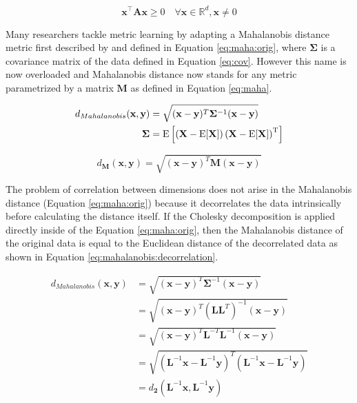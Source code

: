 \documentclass[12pt,a4paper]{report}
\begin{document}
\begin{equation}
\bm{x}^\top \bm{A}\bm{x} \geq 0 \quad \forall \bm{x} \in \mathbb{R}^d, \bm{x} \neq 0 \label{eq:psd:def}
\end{equation}


Many researchers tackle metric learning by adapting a Mahalanobis distance metric first described by \citep{mahalanobis1936generalized} and defined in Equation \ref{eq:maha:orig}, where $\bm{\Sigma}$ is a covariance matrix of the data defined in Equation \ref{eq:cov}. However this name is now overloaded and Mahalanobis distance now stands for any metric parametrized by a matrix $\bm{M}$ as defined in Equation \ref{eq:maha}.

\begin{align} \label{eq:maha:orig}
d_{Mahalanobis}(\textbf{x},\textbf{y}) &= \sqrt{(\textbf{x}-\textbf{y})^T\bm{\Sigma}^{-1}(\textbf{x}-\textbf{y})}  \\
\bm{\Sigma} &= \mathrm {E} \left[\left(\mathbf {X} -\mathrm {E} [\mathbf {X} ]\right)\left(\mathbf {X} -\mathrm {E} [\mathbf {X} ]\right)^{\rm {T}}\right] \label{eq:cov}
\end{align}

\begin{equation} \label{eq:maha}
d_{\bm{M}}(\textbf{x},\textbf{y}) = \sqrt{(\textbf{x}-\textbf{y})^T\bm{M}(\textbf{x}-\textbf{y})} 
\end{equation}

The problem of correlation between dimensions does not arise in the Mahalanobis distance (Equation \ref{eq:maha:orig}) because it decorrelates the data intrinsically before calculating the distance itself. If the Cholesky decomposition is applied directly inside of the Equation \ref{eq:maha:orig}, then the Mahalanobis distance of the original data is equal to the Euclidean distance of the decorrelated data as shown in Equation \ref{eq:mahalanobis:decorrelation}.

\begin{align}
  d_{Mahalanobis}(\textbf{x},\textbf{y}) &= \sqrt{(\textbf{x}-\textbf{y})^{T}\bm{\Sigma}^{-1}(\textbf{x}-\textbf{y})} \nonumber\\
         &= \sqrt{(\textbf{x}-\textbf{y})^{T}(\bm{L}\bm{L}^{T})^{-1}(\textbf{x}-\textbf{y})} \nonumber\\
         &= \sqrt{(\textbf{x}-\textbf{y})^{T}\bm{L}^{-T}\bm{L}^{-1}(\textbf{x}-\textbf{y})} \nonumber\\
         &= \sqrt{(\bm{L}^{-1}\textbf{x}-\bm{L}^{-1}\textbf{y})^{T}(\bm{L}^{-1}\textbf{x}-\bm{L}^{-1}\textbf{y})} \nonumber\\
         &= d_{\bm{2}}(\bm{L}^{-1}\textbf{x}, \bm{L}^{-1}\textbf{y}) \label{eq:mahalanobis:decorrelation}
\end{align}
\end{document}
